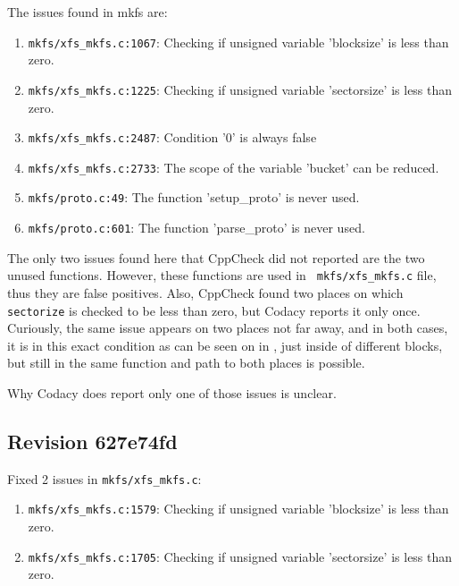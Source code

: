 The issues found in mkfs are:
\begin{enumerate}
	\item {\tt mkfs/xfs\_mkfs.c:1067}: Checking if unsigned variable 'blocksize' is less than zero.
	\item {\tt mkfs/xfs\_mkfs.c:1225}: Checking if unsigned variable 'sectorsize' is less than zero.
	\item {\tt mkfs/xfs\_mkfs.c:2487}: Condition '0' is always false
	\item {\tt mkfs/xfs\_mkfs.c:2733}: The scope of the variable 'bucket' can be reduced.
	\item {\tt mkfs/proto.c:49}: The function 'setup\_proto' is never used.
	\item {\tt mkfs/proto.c:601}: The function 'parse\_proto' is never used.
\end{enumerate}

The only two issues found here that CppCheck did not reported are the two
unused functions. However, these functions are used in {\tt
mkfs/xfs\_mkfs.c} file, thus they are false positives. Also, CppCheck found
two places on which {\tt sectorize} is checked to be less than zero, but
Codacy reports it only once. Curiously, the same issue appears on two
places not far away, and in both cases, it is in this exact condition as
can be seen on  in
, just inside of different blocks, but still in
the same function and path to both places is possible.

Why Codacy does report only one of those issues is unclear.



\subsection{Revision 627e74fd}
Fixed 2 issues in {\tt mkfs/xfs\_mkfs.c}:

\begin{enumerate}
	\item {\tt mkfs/xfs\_mkfs.c:1579}: Checking if unsigned variable
		'blocksize' is less than zero.
	\item {\tt mkfs/xfs\_mkfs.c:1705}: Checking if unsigned variable
		'sectorsize' is less than zero.
\end{enumerate}

